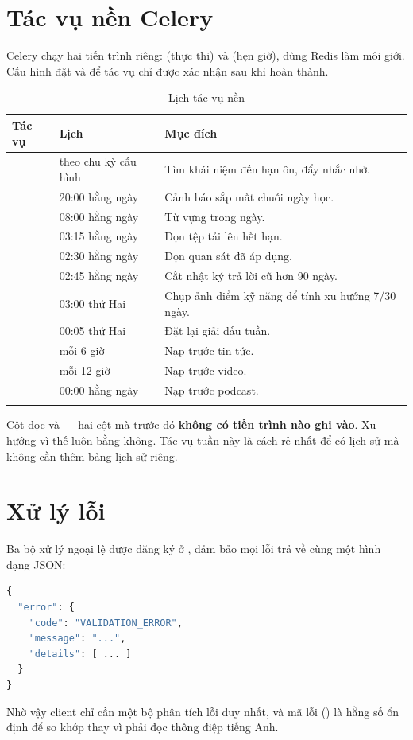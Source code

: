 \section{Tác vụ nền Celery}

Celery chạy hai tiến trình riêng:  (thực thi) và  (hẹn giờ), dùng
Redis làm môi giới. Cấu hình đặt  và
 để tác vụ chỉ được xác nhận sau khi hoàn thành.

\begin{longtable}{L{5.6cm} L{3.2cm} L{4.6cm}}
\toprule
\textbf{Tác vụ} & \textbf{Lịch} & \textbf{Mục đích}\\
\midrule
\endhead
{} & theo chu kỳ cấu hình & Tìm khái niệm đến hạn ôn, đẩy nhắc nhở.\\
 & 20:00 hằng ngày & Cảnh báo sắp mất chuỗi ngày học.\\
 & 08:00 hằng ngày & Từ vựng trong ngày.\\
 & 03:15 hằng ngày & Dọn tệp tải lên hết hạn.\\
 & 02:30 hằng ngày & Dọn quan sát đã áp dụng.\\
 & 02:45 hằng ngày & Cắt nhật ký trả lời cũ hơn 90 ngày.\\
 & 03:00 thứ Hai & Chụp ảnh điểm kỹ năng để tính xu hướng 7/30 ngày.\\
 & 00:05 thứ Hai & Đặt lại giải đấu tuần.\\
 & mỗi 6 giờ & Nạp trước tin tức.\\
 & mỗi 12 giờ & Nạp trước video.\\
 & 00:00 hằng ngày & Nạp trước podcast.\\
\bottomrule
\caption{Lịch tác vụ nền}
\end{longtable}

\begin{luuy}
Cột  đọc  và  —
hai cột mà trước đó \textbf{không có tiến trình nào ghi vào}. Xu hướng vì thế luôn bằng
không. Tác vụ tuần này là cách rẻ nhất để có lịch sử mà không cần thêm bảng lịch sử riêng.
\end{luuy}

\section{Xử lý lỗi}

Ba bộ xử lý ngoại lệ được đăng ký ở , đảm bảo mọi lỗi trả về cùng một hình
dạng JSON:

\begin{lstlisting}[language=Python]
{
  "error": {
    "code": "VALIDATION_ERROR",
    "message": "...",
    "details": [ ... ]
  }
}
\end{lstlisting}

Nhờ vậy client chỉ cần một bộ phân tích lỗi duy nhất, và mã lỗi () là hằng số
ổn định để so khớp thay vì phải đọc thông điệp tiếng Anh.
